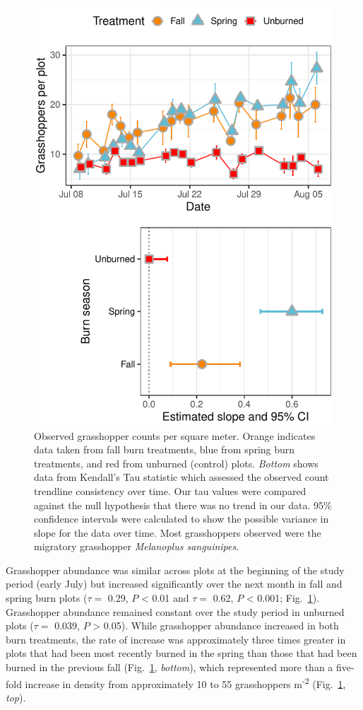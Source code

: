 \documentclass[referee, 
	            sn-basic]
           {sn-jnl}
\begin{document}
\begin{linenumbers}
\begin{figure}
\centering
\includegraphics{tau_gg-1.pdf}
\caption{Observed grasshopper counts per square meter. 
Orange indicates data taken from fall burn treatments, blue from spring burn treatments, and red from unburned (control) plots.
\emph{Bottom} shows data from Kendall's Tau statistic which assessed the observed count trendline consistency over time. 
Our tau values were compared against the null hypothesis that there was no trend in our data. 
95\% confidence intervals were calculated to show the possible variance in slope for the data over time. 
Most grasshoppers observed were the migratory grasshopper \emph{Melanoplus sanguinipes}.}
\label{tau} %
\end{figure}

Grasshopper abundance was similar across plots at the beginning of the study period (early July) but increased significantly over the next month in fall and spring burn plots (\(\tau =\) 0.29, \(P\) \textless{} 0.01 and \(\tau =\) 0.62, \(P\) \textless{} 0.001; Fig.~\ref{tau}). 
Grasshopper abundance remained constant over the study period in unburned plots (\(\tau =\) 0.039, \(P\) \textgreater{} 0.05). 
While grasshopper abundance increased in both burn treatments, the rate of increase was approximately three times greater in plots that had been most recently burned in the spring than those that had been burned in the previous fall (Fig.~\ref{tau}, \emph{bottom}), which represented more than a five-fold increase in density from approximately 10 to 55 grasshoppers m\textsuperscript{-2} (Fig.~\ref{tau}, \emph{top}).


\end{linenumbers}
\end{document}

